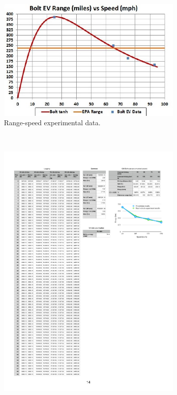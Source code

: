 \documentclass{IEEEtran}
\begin{document}
\begin{figure}   %
\centering
	\begin{subfigure}{0.4\textwidth}
	\includegraphics[width=\hsize]{Figures/Bolt_EV_range.jpg}
	\caption{Range-speed experimental data.}
	\label{fig:range_speed_exp}
	\end{subfigure}
~
	\begin{subfigure}{0.4\textwidth}
	\includegraphics[width=\hsize]{Figures/Range-speed_validation.pdf}

\end{subfigure}
\end{figure}
\end{document}
